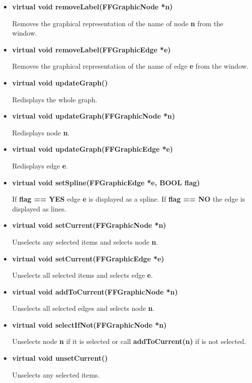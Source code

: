\begin{itemize}
Removes the edge {\bf e} from the window.

\item{\bf virtual void removeLabel(FFGraphicNode *n)}

Removes the graphical representation of the name of node {\bf n} from
the window.

\item{\bf virtual void removeLabel(FFGraphicEdge *e)}

Removes the graphical representation of the name of edge {\bf e} from
the window.

\item{\bf virtual void updateGraph()}

Redisplays the whole graph.

\item{\bf virtual void updateGraph(FFGraphicNode *n)}

Redisplays node {\bf n}.

\item{\bf virtual void updateGraph(FFGraphicEdge *e)}

Redisplays edge {\bf e}.

\item{\bf virtual void setSpline(FFGraphicEdge *e, BOOL flag)}

If {\bf flag == YES} edge {\bf e} is displayed as a spline. If {\bf
flag == NO} the edge is displayed as lines.
  
\item{\bf virtual void setCurrent(FFGraphicNode *n)}

Unselects any selected items and selects node {\bf n}.

\item{\bf virtual void setCurrent(FFGraphicEdge *e)}

Unselects all selected items and selects edge {\bf e}.

\item{\bf virtual void addToCurrent(FFGraphicNode *n)}

Unselects all selected edges and selects node {\bf n}.

\item{\bf virtual void selectIfNot(FFGraphicNode *n)}

Unselects node {\bf n} if it is selected or call {\bf addToCurrent(n)}
if is not selected.

\item{\bf virtual void unsetCurrent()}

Unselects any selected items.


\end{itemize}
